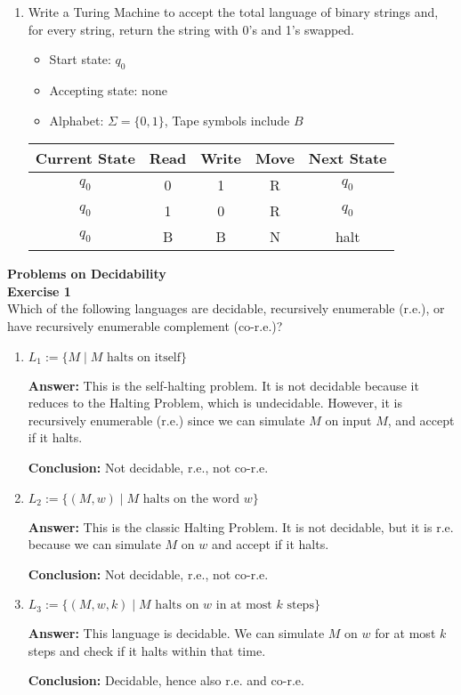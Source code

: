 \documentclass{article}
\theoremstyle{theorem}
\theoremstyle{definition}
\theoremstyle{remark}
\begin{document}
\begin{enumerate}
\item Write a Turing Machine to accept the total language of binary strings and, for every string, return the string with 0's and 1's swapped.
\begin{itemize}
  \item Start state: \( q_0 \)
  \item Accepting state: none
  \item Alphabet: \( \Sigma = \{0,1\} \), Tape symbols include \( B \)
\end{itemize}

\begin{center}
\begin{tabular}{|c|c|c|c|c|}
\hline
Current State & Read & Write & Move & Next State \\
\hline
$q_0$ & 0 & 1 & R & $q_0$ \\
$q_0$ & 1 & 0 & R & $q_0$ \\
$q_0$ & B & B & N & halt \\
\hline
\end{tabular}
\end{center}
\end{enumerate}

\textbf{Problems on Decidability}\\
\textbf{Exercise 1}\\
Which of the following languages are decidable, recursively enumerable (r.e.), or have recursively enumerable complement (co-r.e.)?

\begin{enumerate}
    \item \( L_1 := \{ M \mid \text{$M$ halts on itself} \} \)
    
    \textbf{Answer:} This is the self-halting problem. It is not decidable because it reduces to the Halting Problem, which is undecidable. However, it is recursively enumerable (r.e.) since we can simulate \( M \) on input \( M \), and accept if it halts.
    
    \textbf{Conclusion:} Not decidable, r.e., not co-r.e.

    \item \( L_2 := \{ (M, w) \mid \text{$M$ halts on the word $w$} \} \)
    
    \textbf{Answer:} This is the classic Halting Problem. It is not decidable, but it is r.e. because we can simulate \( M \) on \( w \) and accept if it halts.
    
    \textbf{Conclusion:} Not decidable, r.e., not co-r.e.

    \item \( L_3 := \{ (M, w, k) \mid \text{$M$ halts on $w$ in at most $k$ steps} \} \)

    \textbf{Answer:} This language is decidable. We can simulate \( M \) on \( w \) for at most \( k \) steps and check if it halts within that time.
    
    \textbf{Conclusion:} Decidable, hence also r.e. and co-r.e.
\end{enumerate}
\end{document}

